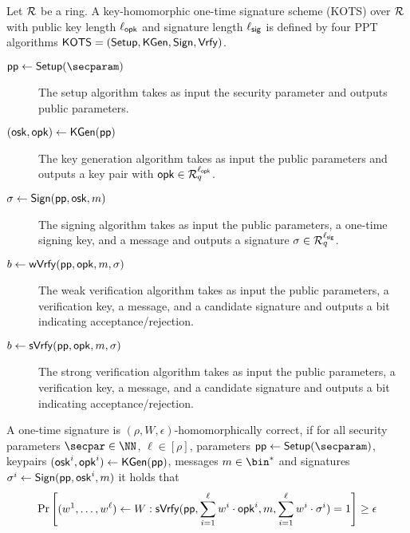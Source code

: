 \begin{definition}\label{def:hots}
  Let $\mathcal{R}$ be a ring.
  A key-homomorphic one-time signature scheme (KOTS) over $\mathcal{R}$ with public key length ${\ell_{\mathsf{opk}}}$ and signature length ${\ell_{\mathsf{sig}}}$ is defined by four PPT algorithms $\mathsf{KOTS}=(\mathsf{Setup},\mathsf{KGen},\mathsf{Sign},\mathsf{Vrfy})$.
  \begin{description}
    \item[$\params\gets\setup(\secparam)$] The setup algorithm takes as input the security parameter and outputs public parameters.
    \item[$(\mathsf{osk},\mathsf{opk}) \gets \mathsf{KGen}(\mathsf{pp})$] The key generation algorithm takes as input the public parameters and outputs a key pair with $\mathsf{opk}\in\mathcal{R}_q^{\ell_{\mathsf{opk}}}$.
    \item[$\sigma \gets \mathsf{Sign}(\mathsf{pp},\mathsf{osk},m)$] The signing algorithm takes as input the public parameters, a one-time signing key, and a message and outputs a signature $\sigma\in\mathcal{R}_q^{\ell_{\mathsf{sig}}}$.
    \item[$b\gets \mathsf{wVrfy}(\mathsf{pp},\mathsf{opk},m,\sigma)$] The weak verification algorithm takes as input the public parameters, a verification key, a message, and a candidate signature and outputs a bit indicating acceptance/rejection.
    \item[$b\gets \mathsf{sVrfy}(\mathsf{pp},\mathsf{opk},m,\sigma)$] The strong verification algorithm takes as input the public parameters, a verification key, a message, and a candidate signature and outputs a bit indicating acceptance/rejection.
  \end{description}
  A one-time signature is $(\rho,W,\epsilon)$-homomorphically correct, if 
  for all security parameters $\secpar\in\NN$, $\ell\in[\rho]$, parameters $\params \gets \setup(\secparam)$, keypairs $(\mathsf{osk}^i,\mathsf{opk}^i) \gets \mathsf{KGen}(\mathsf{pp})$, messages $m\in\bin^*$ and signatures $\sigma^i \gets \mathsf{Sign}(\mathsf{pp},\mathsf{osk}^i,m)$ it holds that
  \[
    \Pr\left[
      \begin{aligned}
      (w^1,\dots,w^\ell)\gets W
      \end{aligned}:
      \mathsf{sVrfy}(\mathsf{pp},\sum_{i=1}^{\ell}w^i\cdot\mathsf{opk}^i,m,\sum_{i=1}^{\ell}w^i\cdot\sigma^i) = 1
    \right]\geq \epsilon
  \]
\end{definition}

